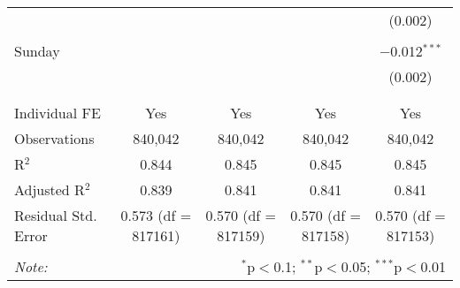 \documentclass[
]{article}
\begin{document}
\begin{table}[!htbp]
{\begin{tabular}{@{\extracolsep{5pt}}lcccc}
  &  &  &  & (0.002) \\ 
  & & & & \\ 
 Sunday &  &  &  & $-$0.012$^{***}$ \\ 
  &  &  &  & (0.002) \\ 
  & & & & \\ 
\hline \\[-1.8ex] 
Individual FE & Yes & Yes & Yes & Yes \\ 
Observations & 840,042 & 840,042 & 840,042 & 840,042 \\ 
R$^{2}$ & 0.844 & 0.845 & 0.845 & 0.845 \\ 
Adjusted R$^{2}$ & 0.839 & 0.841 & 0.841 & 0.841 \\ 
Residual Std. Error & 0.573 (df = 817161) & 0.570 (df = 817159) & 0.570 (df = 817158) & 0.570 (df = 817153) \\ 
\hline 
\hline \\[-1.8ex] 
\textit{Note:}  & \multicolumn{4}{r}{$^{*}$p$<$0.1; $^{**}$p$<$0.05; $^{***}$p$<$0.01} \\ 
\end{tabular}
} 
\end{table} 
\newpage
\end{document}
